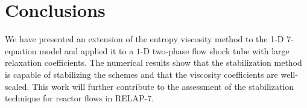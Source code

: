 \documentclass{anstrans}
\begin{document}
\section{Conclusions}

We have presented an extension of the entropy viscosity method to the 1-D 7-equation model and applied it to a $1$-D two-phase flow shock tube with large relaxation coefficients. The numerical results show that the stabilization method is capable of stabilizing the schemes and that the viscosity coefficients are well-scaled. This work will further contribute to the assessment of the stabilization technique for reactor flows in RELAP-7.





\end{document}
